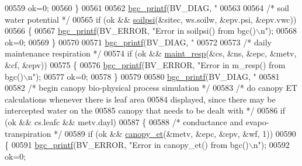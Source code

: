 \begin{DoxyCode}
{{{{{{{{{{{{{00559                 ok=0;
00560             \}
00561 
00562             \hyperlink{bgc__io_8c_af287cce6e2aede1ce337de9319e80d0d}{bgc\_printf}(BV\_DIAG, \textcolor{stringliteral}{"%
00563 
00564             \textcolor{comment}{/* soil water potential */}
00565             \textcolor{keywordflow}{if} (ok && \hyperlink{soilpsi_8c_a16f73418658201a227e8ad4bf8e575ab}{soilpsi}(&sitec, ws.soilw, &epv.psi, &epv.vwc))
00566             \{
00567                 \hyperlink{bgc__io_8c_af287cce6e2aede1ce337de9319e80d0d}{bgc\_printf}(BV\_ERROR, \textcolor{stringliteral}{"Error in soilpsi() from bgc()\(\backslash\)n"});
00568                 ok=0;
00569             \}
00570             
00571             \hyperlink{bgc__io_8c_af287cce6e2aede1ce337de9319e80d0d}{bgc\_printf}(BV\_DIAG, \textcolor{stringliteral}{"%
00572 
00573             \textcolor{comment}{/* daily maintenance respiration */}
00574             \textcolor{keywordflow}{if} (ok && \hyperlink{maint__resp_8c_a246899df0f64edd56b2b0ab3cc4f377d}{maint\_resp}(&cs, &ns, &epc, &metv, &cf, &epv))
00575             \{
00576                 \hyperlink{bgc__io_8c_af287cce6e2aede1ce337de9319e80d0d}{bgc\_printf}(BV\_ERROR, \textcolor{stringliteral}{"Error in m\_resp() from bgc()\(\backslash\)n"});
00577                 ok=0;
00578             \}
00579 
00580             \hyperlink{bgc__io_8c_af287cce6e2aede1ce337de9319e80d0d}{bgc\_printf}(BV\_DIAG, \textcolor{stringliteral}{"%
00581 
00582             \textcolor{comment}{/* begin canopy bio-physical process simulation */}
00583             \textcolor{comment}{/* do canopy ET calculations whenever there is leaf area}
00584 \textcolor{comment}{            displayed, since there may be intercepted water on the }
00585 \textcolor{comment}{            canopy that needs to be dealt with */}
00586             \textcolor{keywordflow}{if} (ok && cs.leafc && metv.dayl)
00587             \{
00588                 \textcolor{comment}{/* conductance and evapo-transpiration */}
00589                 \textcolor{keywordflow}{if} (ok && \hyperlink{canopy__et_8c_a5882089955eaa9ed13e938c6eb383b11}{canopy\_et}(&metv, &epc, &epv, &wf, 1))
00590                 \{
00591                     \hyperlink{bgc__io_8c_af287cce6e2aede1ce337de9319e80d0d}{bgc\_printf}(BV\_ERROR, \textcolor{stringliteral}{"Error in canopy\_et() from bgc()\(\backslash\)n"});
00592                     ok=0;
}}}}}}}}}}}}}}}}
\end{DoxyCode}
